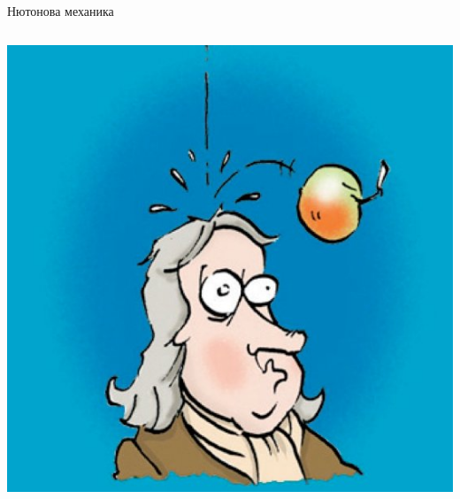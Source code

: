 \documentclass[10pt,a4paper]{beamer}
\begin{document}
        \begin{frame}{ Нютонова механика }
            \begin{columns}
                \begin{column}{0.5\textwidth}
                    \includegraphics[width=\textwidth]{images/newton_apple.jpg}
                \end{column}
            \end{columns}
        \end{frame}
    
\end{document}
